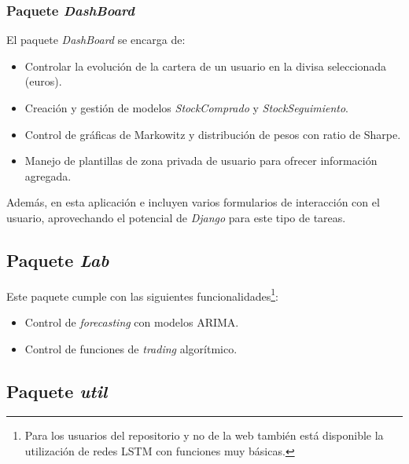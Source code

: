 \subsubsection{Paquete \emph{DashBoard}}

El paquete \emph{DashBoard} se encarga de:

\begin{itemize}
\tightlist
\item
Controlar la evolución de la cartera de un usuario en la divisa seleccionada (euros). 
\item
Creación y gestión de modelos \emph{StockComprado} y \emph{StockSeguimiento}. 
\item
Control de gráficas de Markowitz y distribución de pesos con ratio de Sharpe.
\item
Manejo de plantillas de zona privada de usuario para ofrecer información agregada. 
\end{itemize}

Además, en esta aplicación e incluyen varios formularios de interacción con el usuario, aprovechando el potencial de \emph{Django} para este tipo de tareas.



\subsection{Paquete \emph{Lab}}

Este paquete cumple con las siguientes funcionalidades\footnote{Para los usuarios del repositorio y no de la web también está disponible la utilización de redes LSTM con funciones muy básicas.}:

\begin{itemize}
\tightlist
\item
Control de \emph{forecasting} con modelos ARIMA.
\item
Control de funciones de \emph{trading} algorítmico.
\end{itemize}



\subsection{Paquete \emph{util}}



